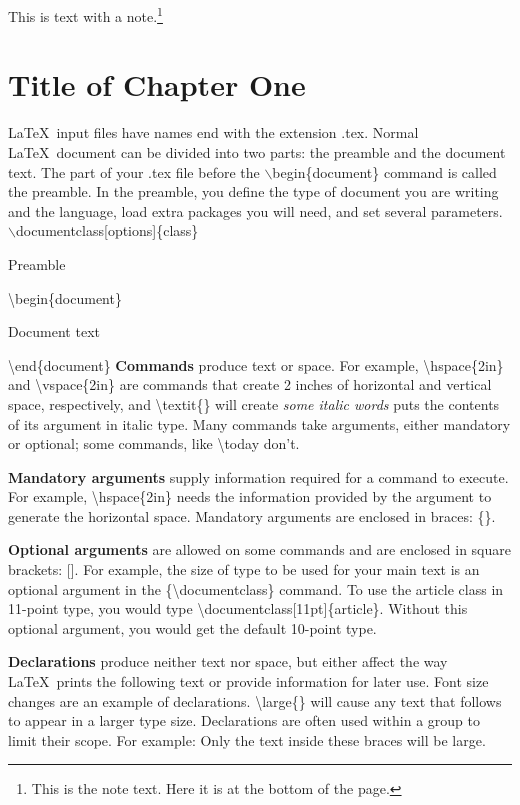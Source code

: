 \documentclass[12pt,openright]{book}
\begin{document}
This is text with a note.\footnote{This is the note text. Here it is at the bottom of the page.}



\mainmatter
\chapter{Title of Chapter One}

\LaTeX\ input files have names end with the extension .tex. Normal \LaTeX\ document can be divided into two parts: the preamble and the document text. The part of your .tex file before the $\backslash$begin\{document\} command is called the preamble. In the preamble, you define the type of document you are writing and the language, load extra packages you will need, and set several parameters. 
\vskip 0.2in
$\backslash$documentclass[options]\{class\}

Preamble

\textbackslash begin\{document\}

Document text
  
\textbackslash end\{document\}
\vskip 0.2in
\textbf{Commands} produce text or space. For example, \textbackslash hspace\{2in\} and \textbackslash vspace\{2in\} are commands that create 2 inches of horizontal and vertical space, respectively, and \textbackslash textit\{\} will create \textit{some italic words} puts the contents of its argument in italic type. Many commands take arguments, either mandatory or optional; some commands, like \textbackslash today don’t.

\textbf{Mandatory arguments} supply information required for a command to execute. For
example, \textbackslash hspace\{2in\} needs the information provided by the argument to generate the horizontal space. Mandatory arguments are enclosed in braces: \{\}.

\textbf{Optional arguments} are allowed on some commands and are enclosed in square brackets: []. For example, the size of type to be used for your main text is an optional
argument in the \{\textbackslash documentclass\} command. To use the article class in 11-point
type, you would type \textbackslash documentclass[11pt]\{article\}. Without this optional
argument, you would get the default 10-point type.


\textbf{Declarations} produce neither text nor space, but either affect the way \LaTeX\ prints the following text or provide information for later use. Font size changes are an
example of declarations. \textbackslash large\{\} will cause any text that follows to appear in a larger type size. Declarations are often used within a group to limit their scope. For
example: {\large Only the text inside these braces will be large.}
\end{document}
